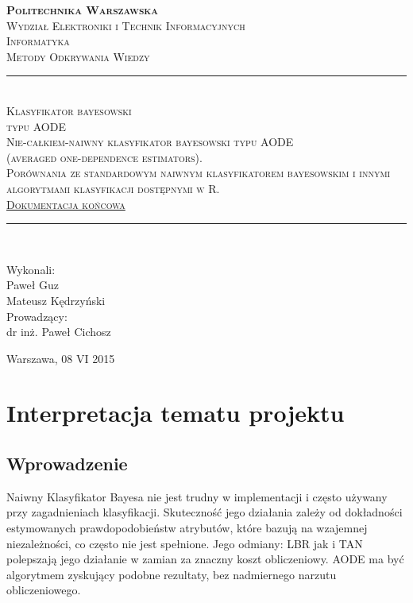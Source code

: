 \documentclass[16]{article}
\begin{document}
	\begin{titlepage}
		\begin{center}
			\vspace*{0cm}
			\textsc{\LARGE \bfseries Politechnika Warszawska}\\[1.5cm]
			\textsc{\large Wydział Elektroniki i Technik Informacyjnych}\\[0.2cm]
			\textsc{\large Informatyka}\\[1.6cm]
			\textsc{\LARGE Metody Odkrywania Wiedzy }\\[1.4cm]
			\rule{\linewidth}{0.5mm} \\ [0.8cm]
      \textsc{\Huge Klasyfikator bayesowski} \\ [0.4cm]
			\textsc{\Huge typu AODE} \\ [0.8cm]
			\textsc{\large Nie-całkiem-naiwny klasyfikator bayesowski typu AODE \\ (averaged one-dependence estimators). \\ Porównania ze standardowym naiwnym klasyfikatorem bayesowskim i innymi algorytmami klasyfikacji dostępnymi w R.} \\ [0.8cm]
			\textsc{\LARGE{\underline {Dokumentacja końcowa}}} \\ [0.8cm]
			\rule{\linewidth}{0.5mm} \\ [1cm]
			
			\begin{flushright}
				Wykonali: \\[0.2cm]
				{\large Paweł Guz}\\[0.2cm]
				{\large Mateusz Kędrzyński}\\[0.8cm]
				Prowadzący: \\[0.2cm]
				{\large dr inż. Paweł Cichosz} \\ [0.8cm]
			\end{flushright}
			\vfill
			{\large Warszawa, 08 VI 2015}
		\end{center}
	\end{titlepage}
	
\section{Interpretacja tematu projektu}
\subsection{Wprowadzenie}
Naiwny Klasyfikator Bayesa nie jest trudny w implementacji i często używany przy zagadnieniach klasyfikacji. Skuteczność jego działania zależy od dokładności estymowanych prawdopodobieństw atrybutów, które bazują na wzajemnej niezależności, co często nie jest spełnione. Jego odmiany: LBR jak i TAN polepszają jego działanie w zamian za znaczny koszt obliczeniowy. AODE ma być algorytmem zyskujący podobne rezultaty, bez nadmiernego narzutu obliczeniowego.
\end{document}
